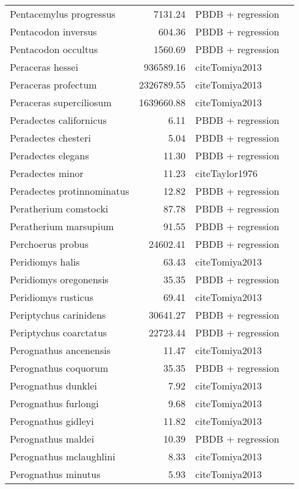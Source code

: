 \begin{table}[ht]
\begin{tabular}{lrll}
  Pentacemylus progressus & 7131.24 & PBDB + regression &  \\ 
  Pentacodon inversus & 604.36 & PBDB + regression &  \\ 
  Pentacodon occultus & 1560.69 & PBDB + regression &  \\ 
  Peraceras hessei & 936589.16 & cite{Tomiya2013} &  \\ 
  Peraceras profectum & 2326789.55 & cite{Tomiya2013} &  \\ 
  Peraceras superciliosum & 1639660.88 & cite{Tomiya2013} &  \\ 
  Peradectes californicus & 6.11 & PBDB + regression &  \\ 
  Peradectes chesteri & 5.04 & PBDB + regression &  \\ 
  Peradectes elegans & 11.30 & PBDB + regression &  \\ 
  Peradectes minor & 11.23 & cite{Taylor1976} &  \\ 
  Peradectes protinnominatus & 12.82 & PBDB + regression &  \\ 
  Peratherium comstocki & 87.78 & PBDB + regression &  \\ 
  Peratherium marsupium & 91.55 & PBDB + regression &  \\ 
  Perchoerus probus & 24602.41 & PBDB + regression &  \\ 
  Peridiomys halis & 63.43 & cite{Tomiya2013} &  \\ 
  Peridiomys oregonensis & 35.35 & PBDB + regression &  \\ 
  Peridiomys rusticus & 69.41 & cite{Tomiya2013} &  \\ 
  Periptychus carinidens & 30641.27 & PBDB + regression &  \\ 
  Periptychus coarctatus & 22723.44 & PBDB + regression &  \\ 
  Perognathus ancenensis & 11.47 & cite{Tomiya2013} &  \\ 
  Perognathus coquorum & 35.35 & PBDB + regression &  \\ 
  Perognathus dunklei & 7.92 & cite{Tomiya2013} &  \\ 
  Perognathus furlongi & 9.68 & cite{Tomiya2013} &  \\ 
  Perognathus gidleyi & 11.82 & cite{Tomiya2013} &  \\ 
  Perognathus maldei & 10.39 & PBDB + regression &  \\ 
  Perognathus mclaughlini & 8.33 & cite{Tomiya2013} &  \\ 
  Perognathus minutus & 5.93 & cite{Tomiya2013} &  \\ 

\end{tabular}
\end{table}
